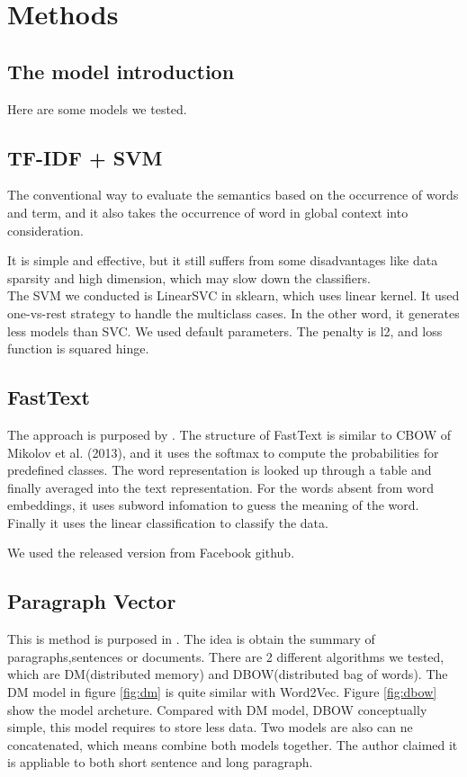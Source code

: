 \chapter{Methods}

\section{The model introduction}

Here are some models we tested.

\section{TF-IDF + SVM}

	The conventional way to evaluate the semantics based on the occurrence of words and term, and it also takes the occurrence of word in global context into consideration.  

  It is simple and effective, but it still suffers from some disadvantages like data sparsity and high dimension, which may slow down the classifiers. \\

  The SVM we conducted is LinearSVC in sklearn, which uses linear kernel. It used one-vs-rest strategy to handle the multiclass cases.
  In the other word, it generates less models than SVC.
  We used default parameters. The penalty is l2, and loss function is squared hinge. 
\section{FastText}
	
The approach is purposed by \cite{joulin2016fasttext}. 
The structure of FastText is similar to CBOW of Mikolov et al. (2013), and it uses the softmax to compute the probabilities for predefined classes. 
The word representation is looked up through a table and finally averaged into the text representation. 
For the words absent from word embeddings, it uses subword infomation\cite{bojanowski2016enriching} to guess the meaning of the word.
Finally it uses the linear classification to classify the data.

We used the released version from Facebook github.

\section{Paragraph Vector}
	
This is method is purposed in \cite{PVDB}. The idea is obtain the summary of paragraphs,sentences or documents. 
There are 2 different algorithms we tested, which are DM(distributed memory) and DBOW(distributed bag of words). 
The DM model in figure \ref{fig:dm} is quite similar with Word2Vec.
Figure \ref{fig:dbow} show the model archeture. Compared with DM model, DBOW conceptually simple, this model requires to store less data. 
Two models are also can ne concatenated, which means combine both models together. The author claimed it is appliable to  both short sentence and long paragraph.\\

